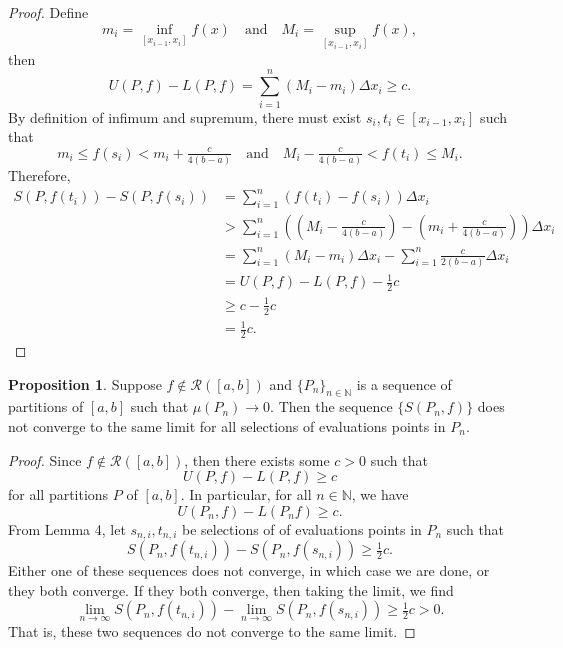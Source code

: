 \documentclass[12pt]{article}
\theoremstyle{definition}
\newtheorem{proposition}{Proposition}
\newcommand{\isp}[1]{\quad\text{#1}\quad}
\newcommand{\N}{\mathbb{N}}
\begin{document}
\begin{proof}
    Define
    \[
        m_i = \inf_{[x_{i-1}, x_i]} f(x) \isp{and} M_i = \sup_{[x_{i-1}, x_i]} f(x),
    \]
    then
    \[
        U(P, f) - L(P, f) = \sum_{i=1}^n (M_i - m_i) \Delta x_i \geq c.
    \]
    By definition of infimum and supremum, there must exist $s_i, t_i \in [x_{i-1}, x_i]$ such that
    \[
        m_i \leq f(s_i) < m_i + \tfrac{c}{4(b-a)} \isp{and} M_i - \tfrac{c}{4(b-a)} < f(t_i) \leq M_i.
    \]
    Therefore,
    \begin{align*}
        S(P, f(t_i)) - S(P, f(s_i))
            &= \sum_{i=1}^n (f(t_i) - f(s_i)) \Delta x_i \\
            &> \sum_{i=1}^n \left(\left(M_i - \tfrac{c}{4(b-a)}\right) - \left(m_i + \tfrac{c}{4(b-a)}\right)\right) \Delta x_i \\
            &= \sum_{i=1}^n (M_i - m_i) \Delta x_i - \sum_{i=1}^n \tfrac{c}{2(b-a)} \Delta x_i \\
            &= U(P, f) - L(P, f) - \tfrac12c \\
            &\geq c - \tfrac12c \\
            &= \tfrac12 c.
    \end{align*}
    
\end{proof}

\newpage
\begin{proposition}
    Suppose $f \notin \mathcal{R}([a,b])$ and $\{P_n\}_{n\in \N}$ is a sequence of partitions of $[a, b]$ such that $\mu(P_n) \to 0$. Then the sequence $\{S(P_n, f)\}$ does not converge to the same limit for all selections of evaluations points in $P_n$.
\end{proposition}

\begin{proof}
    Since $f \notin \mathcal{R}([a,b])$, then there exists some $c > 0$ such that
    \[
        U(P, f) - L(P, f) \geq c
    \]
    for all partitions $P$ of $[a, b]$. In particular, for all $n \in \N$, we have
    \[
        U(P_n, f) - L(P_n f) \geq c.
    \]
    From Lemma 4, let $s_{n,i}, t_{n,i}$ be selections of of evaluations points in $P_n$ such that
    \[
        S(P_n, f(t_{n,i})) - S(P_n, f(s_{n,i})) \geq \tfrac12 c.
    \]
    Either one of these sequences does not converge, in which case we are done, or they both converge. If they both converge, then taking the limit, we find
    \[
        \lim_{n \to \infty} S(P_n, f(t_{n,i})) - \lim_{n \to \infty} S(P_n, f(s_{n,i})) \geq \tfrac12 c > 0.
    \]
    That is, these two sequences do not converge to the same limit.
    
\end{proof}
\end{document}
